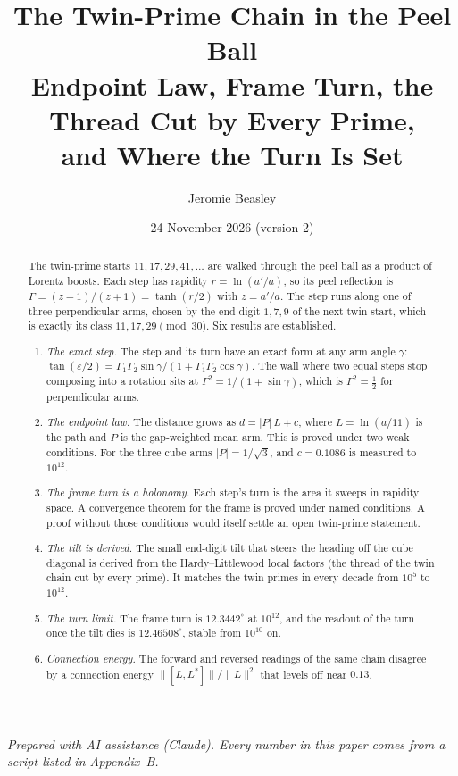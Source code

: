 \documentclass[11pt]{article}
\title{The Twin-Prime Chain in the Peel Ball\\[4pt]\large Endpoint Law, Frame Turn, the Thread Cut by Every Prime,\\ and Where the Turn Is Set}
\author{Jeromie Beasley}
\date{24 November 2026 \quad (version 2)}
\theoremstyle{definition}
\theoremstyle{remark}
\begin{document}
\maketitle

\begin{center}\small\emph{Prepared with AI assistance (Claude). Every number in this paper comes from a script listed in Appendix~B.}\end{center}

\begin{abstract}
The twin-prime starts $11,17,29,41,\dots$ are walked through the peel ball as a product of Lorentz boosts. Each step has rapidity $r=\ln(a'/a)$, so its peel reflection is $\Gamma=(z-1)/(z+1)=\tanh(r/2)$ with $z=a'/a$. The step runs along one of three perpendicular arms, chosen by the end digit $1,7,9$ of the next twin start, which is exactly its class $11,17,29 \pmod{30}$. Six results are established.
\begin{enumerate}
\item \emph{The exact step.} The step and its turn have an exact form at any arm angle $\gamma$: $\tan(\varepsilon/2)=\Gamma_1\Gamma_2\sin\gamma/(1+\Gamma_1\Gamma_2\cos\gamma)$. The wall where two equal steps stop composing into a rotation sits at $\Gamma^2=1/(1+\sin\gamma)$, which is $\Gamma^2=\tfrac12$ for perpendicular arms.
\item \emph{The endpoint law.} The distance grows as $d=|P|\,L+c$, where $L=\ln(a/11)$ is the path and $P$ is the gap-weighted mean arm. This is proved under two weak conditions. For the three cube arms $|P|=1/\sqrt3$, and $c=0.1086$ is measured to $10^{12}$.
\item \emph{The frame turn is a holonomy.} Each step's turn is the area it sweeps in rapidity space. A convergence theorem for the frame is proved under named conditions. A proof without those conditions would itself settle an open twin-prime statement.
\item \emph{The tilt is derived.} The small end-digit tilt that steers the heading off the cube diagonal is derived from the Hardy--Littlewood local factors (the thread of the twin chain cut by every prime). It matches the twin primes in every decade from $10^5$ to $10^{12}$.
\item \emph{The turn limit.} The frame turn is $12.3442^\circ$ at $10^{12}$, and the readout of the turn once the tilt dies is $12.46508^\circ$, stable from $10^{10}$ on.
\item \emph{Connection energy.} The forward and reversed readings of the same chain disagree by a connection energy $\|[L,L^*]\|/\|L\|^2$ that levels off near $0.13$.

\end{enumerate}
\end{abstract}
\end{document}
